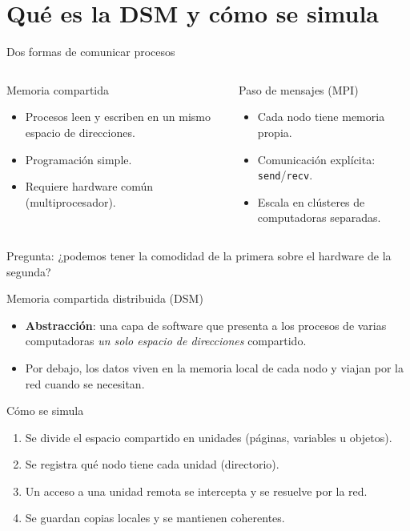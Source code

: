 \documentclass[aspectratio=169,11pt]{beamer}
\newcommand{\exponente}{}
\newcommand{\seccion}[2]{\renewcommand{\exponente}{#2}\section{#1}}
\begin{document}
\seccion{Qué es la DSM y cómo se simula}{Ever}

\begin{frame}{Dos formas de comunicar procesos}
  \begin{columns}[T]
    \begin{block}{\faMemory\enspace Memoria compartida}
      \begin{itemize}
        \item Procesos leen y escriben en un mismo espacio de direcciones.
        \item Programación simple.
        \item Requiere hardware común (multiprocesador).
      \end{itemize}
    \end{block}
    \begin{block}{\faEnvelope\enspace Paso de mensajes (MPI)}
      \begin{itemize}
        \item Cada nodo tiene memoria propia.
        \item Comunicación explícita: \texttt{send}/\texttt{recv}.
        \item Escala en clústeres de computadoras separadas.
      \end{itemize}
    \end{block}
  \end{columns}
  \vspace{.9em}
  {\color{ambar}\faLightbulb}\enspace\alert{Pregunta:} ¿podemos tener la comodidad de la primera sobre el hardware de la segunda?
\end{frame}

\begin{frame}{Memoria compartida distribuida (DSM)}
  \begin{itemize}
    \item \textbf{Abstracción}: una capa de software que presenta a los procesos de varias computadoras \emph{un solo espacio de direcciones} compartido.
    \item Por debajo, los datos viven en la memoria local de cada nodo y viajan por la red cuando se necesitan.
  \end{itemize}
  \begin{block}{\faCogs\enspace Cómo se simula}
    \begin{enumerate}
      \item Se divide el espacio compartido en unidades (páginas, variables u objetos).
      \item Se registra qué nodo tiene cada unidad (directorio).
      \item Un acceso a una unidad remota se intercepta y se resuelve por la red.
      \item Se guardan copias locales y se mantienen coherentes.
    \end{enumerate}
  \end{block}
\end{frame}
\end{document}
